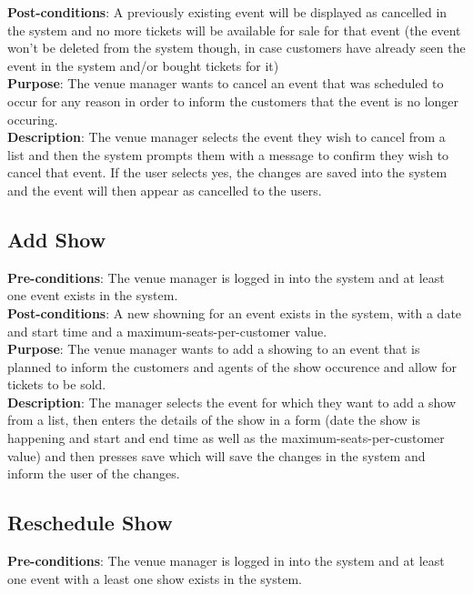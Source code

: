 \textbf{Post-conditions}: A previously existing event will be displayed
as cancelled in the system and no more tickets will be available for sale
for that event (the event won't be deleted from the system though, in case
customers have already seen the event in the system and/or bought tickets
for it)\\

\textbf{Purpose}: The venue manager wants to cancel an event that was
scheduled to occur for any reason in order to inform the customers
that the event is no longer occuring.\\

\textbf{Description}: The venue manager selects the event they wish to
cancel from a list and then the system prompts them with a message
to confirm they wish to cancel that event. If the user selects yes, the
changes are saved into the system and the event will then appear as
cancelled to the users.

\subsection{Add Show}
\textbf{Pre-conditions}: The venue manager is logged in into the system
and at least one event exists in the system.\\

\textbf{Post-conditions}: A new showning for an event exists in the system,
with a date and start time and a maximum-seats-per-customer value.\\

\textbf{Purpose}: The venue manager wants to add a showing to an event
that is planned to inform the customers and agents of the show occurence
and allow for tickets to be sold.\\

\textbf{Description}: The manager selects the event for which they
want to add a show from a list, then enters the details of the show
in a form (date the show is happening and start and end time as well
as the maximum-seats-per-customer value) and then presses save which
will save the changes in the system and inform the user of the changes.

\subsection{Reschedule Show}
\textbf{Pre-conditions}: The venue manager is logged in into the system
and at least one event with a least one show exists in the system.\\

